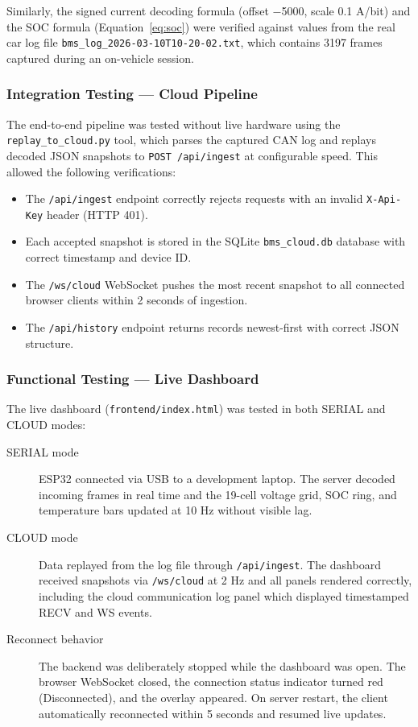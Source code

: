 Similarly, the signed current decoding formula (offset $-$5000, scale 0.1 A/bit) and the SOC formula (Equation~\eqref{eq:soc}) were verified against values from the real car log file \texttt{bms\_log\_2026-03-10T10-20-02.txt}, which contains 3197 frames captured during an on-vehicle session.

\subsubsection{Integration Testing — Cloud Pipeline}

The end-to-end pipeline was tested without live hardware using the \texttt{replay\_to\_cloud.py} tool, which parses the captured CAN log and replays decoded JSON snapshots to \texttt{POST /api/ingest} at configurable speed. This allowed the following verifications:

\begin{itemize}
    \item The \texttt{/api/ingest} endpoint correctly rejects requests with an invalid \texttt{X-Api-Key} header (HTTP 401).
    \item Each accepted snapshot is stored in the SQLite \texttt{bms\_cloud.db} database with correct timestamp and device ID.
    \item The \texttt{/ws/cloud} WebSocket pushes the most recent snapshot to all connected browser clients within 2 seconds of ingestion.
    \item The \texttt{/api/history} endpoint returns records newest-first with correct JSON structure.
\end{itemize}

\subsubsection{Functional Testing — Live Dashboard}

The live dashboard (\texttt{frontend/index.html}) was tested in both SERIAL and CLOUD modes:

\begin{description}
    \item[SERIAL mode] ESP32 connected via USB to a development laptop. The server decoded incoming frames in real time and the 19-cell voltage grid, SOC ring, and temperature bars updated at 10 Hz without visible lag.
    \item[CLOUD mode] Data replayed from the log file through \texttt{/api/ingest}. The dashboard received snapshots via \texttt{/ws/cloud} at 2 Hz and all panels rendered correctly, including the cloud communication log panel which displayed timestamped RECV and WS events.
    \item[Reconnect behavior] The backend was deliberately stopped while the dashboard was open. The browser WebSocket closed, the connection status indicator turned red (Disconnected), and the overlay appeared. On server restart, the client automatically reconnected within 5 seconds and resumed live updates.
\end{description}

